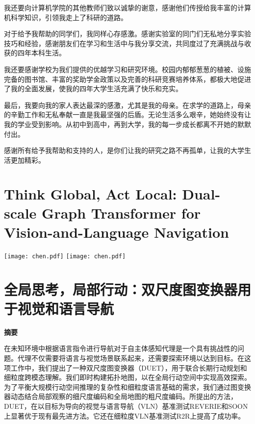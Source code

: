 \documentclass[bachelor]{thesis-uestc}
\begin{document}
我还要向计算机学院的其他教师们致以诚挚的谢意，感谢他们传授给我丰富的计算机科学知识，引领我走上了科研的道路。

对于给予我帮助的同学们，我同样心存感激。感谢实验室的同门们无私地分享实验技巧和经验，感谢朋友们在学习和生活中与我分享交流，共同度过了充满挑战与收获的四年本科生活。

我还要感谢学校为我们提供的优越学习和研究环境。校园内郁郁葱葱的植被、设施完备的图书馆、丰富的奖助学金政策以及完善的科研竞赛培养体系，都极大地促进了我的全面发展，使我的四年大学生活充满了快乐和充实。

最后，我要向我的家人表达最深的感激，尤其是我的母亲。在求学的道路上，母亲的辛勤工作和无私奉献一直是我最坚强的后盾。无论生活多么艰辛，她始终没有让我的学业受到影响。从初中到高中，再到大学，我的每一步成长都离不开她的默默付出。

感谢所有给予我帮助和支持的人，是你们让我的研究之路不再孤单，让我的大学生活更加精彩。


%
% 
%
% 
% 
%



\thesistranslationoriginal
\section{Think Global, Act Local: Dual-scale Graph Transformer for Vision-and-Language Navigation}
\texttt{[image: chen.pdf]}
\newpage
\texttt{[image: chen.pdf]}

\thesistranslationchinese
\section{全局思考，局部行动：双尺度图变换器用于视觉和语言导航}

\textbf{摘要}

在未知环境中根据语言指令进行导航对于自主体感知代理是一个具有挑战性的问题。代理不仅需要将语言与视觉场景联系起来，还需要探索环境以达到目标。在这项工作中，我们提出了一种双尺度图变换器（DUET），用于联合长期行动规划和细粒度跨模态理解。我们即时构建拓扑地图，以在全局行动空间中实现高效探索。为了平衡大规模行动空间推理的复杂性和细粒度语言基础的需求，我们通过图变换器动态结合局部观察的细尺度编码和全局地图的粗尺度编码。所提出的方法，DUET，在以目标为导向的视觉与语言导航（VLN）基准测试REVERIE和SOON上显著优于现有最先进方法。它还在细粒度VLN基准测试R2R上提高了成功率。
\end{document}
